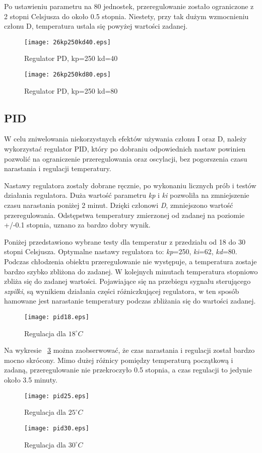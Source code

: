 Po ustawieniu parametru na 80 jednostek, przeregulowanie zostało ograniczone z  2 stopni Celsjusza do około 0.5 stopnia. Niestety, przy tak dużym wzmocnieniu członu D, temperatura ustala się powyżej wartości zadanej.
\newpage
\begin{figure}[H]
	\centering
	\texttt{[image: 26kp250kd40.eps]}
	\caption{Regulator PD, kp=250 kd=40}
\end{figure}
\begin{figure}[H]
	\centering
	\texttt{[image: 26kp250kd80.eps]}
	\caption{Regulator PD, kp=250 kd=80}
\end{figure}

\subsection{PID}
W celu zniwelowania niekorzystnych efektów używania członu I oraz D, należy wykorzystać regulator PID, który po dobraniu odpowiednich nastaw powinien pozwolić na ograniczenie przeregulowania oraz oscylacji, bez pogorszenia czasu narastania i regulacji temperatury.

Nastawy regulatora zostały dobrane ręcznie, po wykonaniu licznych prób i testów działania regulatora. Duża wartość parametru \textit{kp} i \textit{ki} pozwoliła na zmniejszenie czasu narastania poniżej 2 minut. Dzięki członowi \textit{D}, zmniejszono wartość przeregulowania. Odstępstwa temperatury zmierzonej od zadanej na poziomie +/-0.1 stopnia, uznano za bardzo dobry wynik.

Poniżej przedstawiono wybrane testy dla temperatur z przedziału od 18 do 30 stopni Celsjusza. Optymalne nastawy regulatora to: \textit{kp}=250, \textit{ki}=62, \textit{kd}=80.
Podczas chłodzenia obiektu przeregulowanie nie występuje, a temperatura zostaje bardzo szybko zbliżona do zadanej. W kolejnych minutach temperatura stopniowo zbliża się do zadanej wartości. Pojawiające się na przebiegu sygnału sterującego \textit{szpilki}, są wynikiem działania części różniczkującej regulatora, w ten sposób hamowane jest narastanie temperatury podczas zbliżania się do wartości zadanej.
\begin{figure}[H]
	\centering
	\texttt{[image: pid18.eps]}
	\caption{Regulacja dla $18^{\circ} C$}
	\label{fig:pid18}
\end{figure}
Na wykresie ~\ref{fig:pid30} można zaobserwować, że czas narastania i regulacji został bardzo mocno skrócony. Mimo dużej różnicy pomiędzy temperaturą początkową i zadaną, przeregulowanie nie przekroczyło 0.5 stopnia, a czas regulacji to jedynie około 3.5 minuty. 
\begin{figure}[H]
	\centering
	\texttt{[image: pid25.eps]}
	\caption{Regulacja dla $25^{\circ} C$ }
	\label{fig:pid25}
\end{figure}
\begin{figure}[H]
	\centering
	\texttt{[image: pid30.eps]}
	\caption{Regulacja dla $30^{\circ} C$ }
	\label{fig:pid30}
\end{figure}
